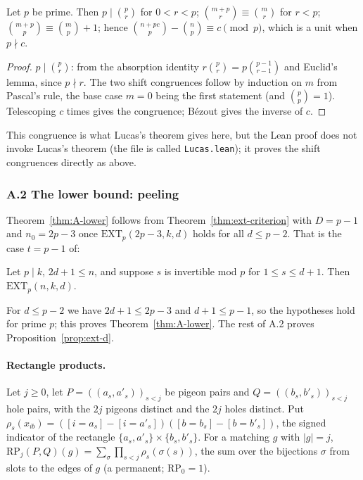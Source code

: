 \begin{lemma}\label{lem:A-binom}
Let $p$ be prime.  Then $p\mid\binom pr$ for $0<r<p$; $\binom{m+p}r\equiv\binom mr$
for $r<p$; $\binom{m+p}p\equiv\binom mp+1$; hence
$\binom{n+pc}p-\binom np\equiv c\pmod p$, which is a unit when
$p\nmid c$.
\end{lemma}

\begin{proof}
$p\mid\binom pr$: from the absorption identity $r\binom pr=p\binom{p-1}{r-1}$ and
Euclid's lemma, since $p\nmid r$.  The two shift congruences follow by induction on
$m$ from Pascal's rule, the base case $m=0$ being the first statement (and
$\binom pp=1$).  Telescoping $c$ times gives the congruence; B\'ezout gives the
inverse of $c$.
\end{proof}

\begin{remark}
This congruence is what Lucas's theorem gives here, but the Lean proof does not
invoke Lucas's theorem (the file is called \texttt{Lucas.lean}); it proves the
shift congruences directly as above.
\end{remark}

\subsubsection*{A.2 The lower bound: peeling}

Theorem~\ref{thm:A-lower} follows from Theorem~\ref{thm:ext-criterion} with
$D=p-1$ and $n_0=2p-3$ once $\mathrm{EXT}_p(2p-3,k,d)$ holds for all $d\le p-2$.
That is the case $t=p-1$ of:

\begin{proposition}\label{prop:ext-d}
Let $p\mid k$, $2d+1\le n$, and suppose $s$ is invertible mod $p$ for
$1\le s\le d+1$.  Then $\mathrm{EXT}_p(n,k,d)$.
\end{proposition}

For $d\le p-2$ we have $2d+1\le 2p-3$ and $d+1\le p-1$, so the hypotheses hold for
prime $p$; this proves Theorem~\ref{thm:A-lower}.
The rest of A.2 proves Proposition~\ref{prop:ext-d}.

\paragraph{Rectangle products.}
Let $j\ge0$, let $P=((a_s,a'_s))_{s<j}$ be pigeon pairs and $Q=((b_s,b'_s))_{s<j}$
hole pairs, with the $2j$ pigeons distinct and the $2j$ holes distinct.  Put
$\rho_s(x_{ib})=([i=a_s]-[i=a'_s])([b=b_s]-[b=b'_s])$, the signed indicator of the
rectangle $\{a_s,a'_s\}\times\{b_s,b'_s\}$.  For a matching $g$ with $|g|=j$,
$\mathrm{RP}_j(P,Q)(g)=\sum_\sigma\prod_{s<j}\rho_s(\sigma(s))$, the sum over the
bijections $\sigma$ from slots to the edges of $g$ (a permanent; $\mathrm{RP}_0=1$).

